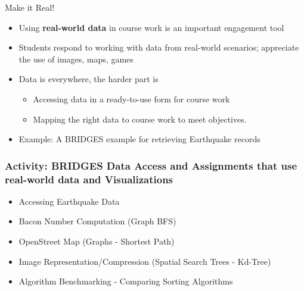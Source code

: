 \documentclass[aspectratio=169]{beamer}
\begin{document}
\begin{frame}{Make it Real!}
\begin{itemize}
\item Using \textbf{real-world data} in course work is an important engagement tool
\item Students respond to working with data from real-world scenarios;
	appreciate the use of images, maps, games
\item Data is everywhere, the harder part is 
	\begin{itemize}
		\item Accessing data in a ready-to-use form for course work
		\item Mapping the right data to course work to meet objectives.
	\end{itemize}
\item Example: A BRIDGES example for retrieving Earthquake records 
\end{itemize}
\end{frame}
\begin{frame}
  \frametitle{Activity: BRIDGES Data Access and  Assignments that use
	real-world data and Visualizations}
	\begin{itemize}
		\item Accessing Earthquake Data  
		\item Bacon Number Computation (Graph BFS)
		\item OpenStreet Map (Graphs - Shortest Path)
		\item Image Representation/Compression (Spatial Search Trees - Kd-Tree)
		\item Algorithm Benchmarking - Comparing Sorting Algorithms
	\end{itemize}
\end{frame}
\end{document}
